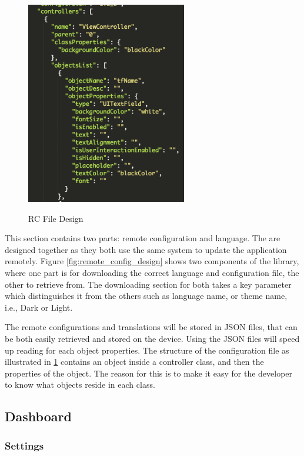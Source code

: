 \begin{figure}[!h]
    \caption{RC File Design}
    \centering
    \includegraphics[width=70mm]{images/design/rc_file}
    \label{fig:rc_file_design}
\end{figure}

This section contains two parts: remote configuration and language. The are designed together as they both use the same system to update the application remotely. Figure \ref{fig:remote_config_design} shows two components of the library, where one part is for downloading the correct language and configuration file, the other to retrieve from. The downloading section for both takes a key parameter which distinguishes it from the others such as language name, or theme name, i.e., Dark or Light.  

The remote configurations and translations will be stored in JSON files, that can be both easily retrieved and stored on the device. Using the JSON files will speed up reading for each object properties. The structure of the configuration file as illustrated in \ref{fig:rc_file_design} contains an object inside a controller class, and then the properties of the object. The reason for this is to make it easy for the developer to know what objects reside in each class. 

\subsection{Dashboard}

\subsubsection{Settings} \label{d-db:settings}


